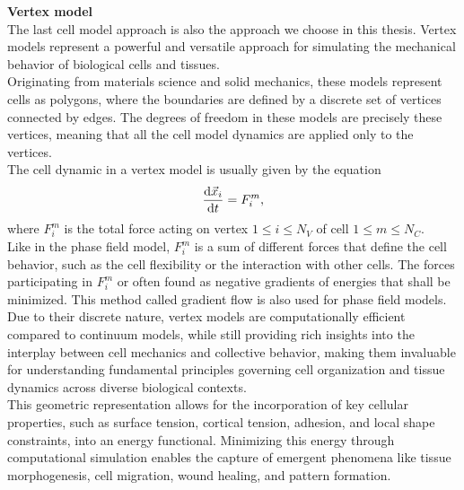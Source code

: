 \textbf{Vertex model} \\
The last cell model approach is also the approach we choose in this thesis. 
Vertex models represent a powerful and versatile approach for simulating the mechanical behavior of biological cells and tissues. \\
Originating from materials science and solid mechanics, these models represent cells as polygons, where the boundaries are defined by a discrete set of vertices connected by edges. 
The degrees of freedom in these models are precisely these vertices, meaning that all the cell model dynamics are applied only to the vertices. \\
The cell dynamic in a vertex model is usually given by the equation
\begin{align}
	\dfrac{\mathrm{d} \vec{x}_i}{\mathrm{d} t} = F_i^m, \label{eq:vertexmodel}
\end{align}
where $F_i^m$ is the total force acting on vertex $1 \leq i \leq N_V$ of cell $1 \leq m \leq N_C$. \\
Like in the phase field model, $F_i^m$ is a sum of different forces that define the cell behavior, such as the cell flexibility or the interaction with other cells. 
The forces participating in $F_i^m$ or often found as negative gradients of energies that shall be minimized. 
This method called gradient flow is also used for phase field models. \\
Due to their discrete nature, vertex models are computationally efficient compared to continuum models, while still providing rich insights into the interplay between cell mechanics and collective behavior, making them invaluable for understanding fundamental principles governing cell organization and tissue dynamics across diverse biological contexts. \\
This geometric representation allows for the incorporation of key cellular properties, such as surface tension, cortical tension, adhesion, and local shape constraints, into an energy functional. 
Minimizing this energy through computational simulation enables the capture of emergent phenomena like tissue morphogenesis, cell migration, wound healing, and pattern formation. \\

